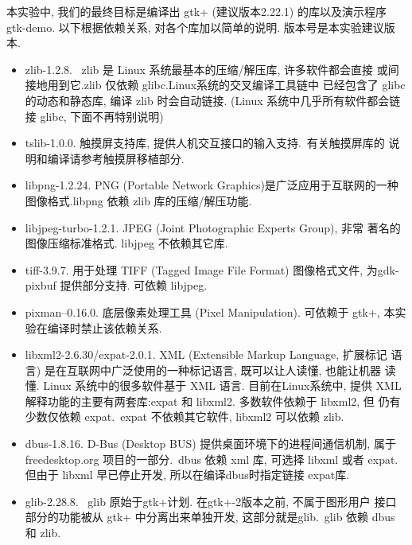 本实验中, 我们的最终目标是编译出 gtk+ (建议版本2.22.1) 的库以及演示程序
gtk-demo. 以下根据依赖关系, 对各个库加以简单的说明. 版本号是本实验建议版本.
\begin{itemize}
  \item zlib-1.2.8. \ zlib 是 Linux 系统最基本的压缩/解压库, 许多软件都会直接
      或间接地用到它.\@ zlib 仅依赖 glibc. Linux系统的交叉编译工具链中
      已经包含了 glibc 的动态和静态库, 编译 zlib 时会自动链接.
      (Linux 系统中几乎所有软件都会链接 glibc, 下面不再特别说明)

  \item tslib-1.0.0. 触摸屏支持库, 提供人机交互接口的输入支持.~有关触摸屏库的
      说明和编译请参考触摸屏移植部分.

  \item libpng-1.2.24. PNG (Portable Network Graphics)是广泛应用于互联网的一种
      图像格式.\@ libpng 依赖 zlib 库的压缩/解压功能.

  \item libjpeg-turbo-1.2.1. JPEG (Joint Photographic Experts Group), 非常
      著名的图像压缩标准格式. libjpeg 不依赖其它库.

  \item tiff-3.9.7. 用于处理 TIFF (Tagged Image File Format) 图像格式文件,
      为gdk-pixbuf 提供部分支持. 可依赖 libjpeg.

  \item pixman--0.16.0. 底层像素处理工具 (Pixel Manipulation). 可依赖于
      gtk+, 本实验在编译时禁止该依赖关系.

  \item libxml2-2.6.30/expat-2.0.1. XML (Extensible Markup Language, 扩展标记
      语言) 是在互联网中广泛使用的一种标记语言, 既可以让人读懂, 也能让机器
      读懂. Linux 系统中的很多软件基于 XML 语言. 目前在Linux系统中, 提供 XML
      解释功能的主要有两套库:expat 和 libxml2. 多数软件依赖于 libxml2, 但
      仍有少数仅依赖 expat.\ expat 不依赖其它软件, libxml2 可以依赖 zlib.

  \item dbus-1.8.16. D-Bus (Desktop BUS) 提供桌面环境下的进程间通信机制, 属于
      freedesktop.org 项目的一部分.\ dbus 依赖 xml 库, 可选择 libxml 或者
      expat. 但由于 libxml 早已停止开发, 所以在编译dbus时指定链接 expat库.

  \item glib-2.28.8. \ glib 原始于gtk+计划. 在gtk+-2版本之前, 不属于图形用户
      接口部分的功能被从 gtk+ 中分离出来单独开发, 这部分就是glib.\ glib 依赖
      dbus 和 zlib.


\end{itemize}
